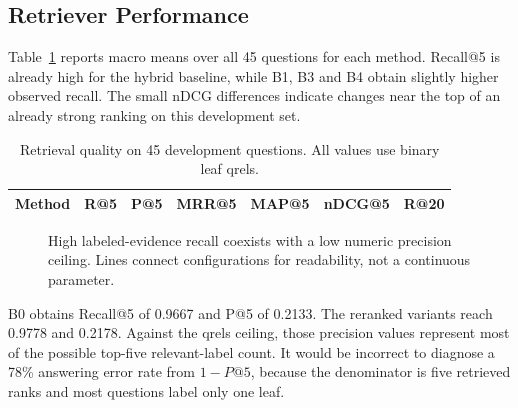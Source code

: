 \subsection{Retriever Performance}
Table~\ref{tab:retrieval} reports macro means over all 45 questions for each method. Recall@5 is already high for the hybrid baseline, while B1, B3 and B4 obtain slightly higher observed recall. The small nDCG differences indicate changes near the top of an already strong ranking on this development set.

\begin{table}[H]\centering\small
\caption{Retrieval quality on 45 development questions. All values use binary leaf qrels.}\label{tab:retrieval}
\begin{tabular}{lrrrrrr}\toprule
\textbf{Method} & \textbf{R@5} & \textbf{P@5} & \textbf{MRR@5} & \textbf{MAP@5} & \textbf{nDCG@5} & \textbf{R@20}\\\midrule

\bottomrule\end{tabular}
\end{table}

\begin{figure}[H]\centering
{}
\caption{High labeled-evidence recall coexists with a low numeric precision ceiling. Lines connect configurations for readability, not a continuous parameter.}\label{fig:retrieval}
\end{figure}

B0 obtains Recall@5 of 0.9667 and P@5 of 0.2133. The reranked variants reach 0.9778 and 0.2178. Against the qrels ceiling, those precision values represent most of the possible top-five relevant-label count. It would be incorrect to diagnose a 78\% answering error rate from $1-P@5$, because the denominator is five retrieved ranks and most questions label only one leaf.

